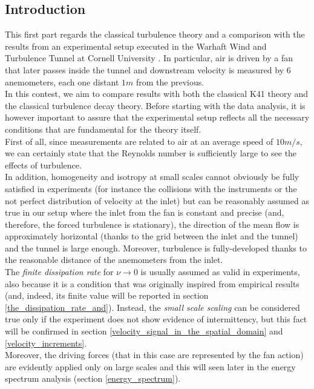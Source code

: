 \documentclass[11pt,titlepage]{article}
\begin{document}
\subsection{Introduction} %
This first part regards the classical turbulence theory and a comparison with the results from an experimental setup executed in the Warhaft Wind and Turbulence Tunnel at Cornell University \cite{yoon_warhaft_1990}. In particular, air is driven by a fan that later passes inside the tunnel and downstream velocity is measured by 6 anemometers, each one distant $1m$ from the previous. \\
In this contest, we aim to compare results with both the classical K41 theory and the classical turbulence decay theory. Before starting with the data analysis, it is however important to assure that the experimental setup reflects all the necessary conditions that are fundamental for the theory itself. \\
First of all, since measurements are related to air at an average speed of $10m/s$, we can certainly state that the Reynolds number is sufficiently large to see the effects of turbulence. \\
In addition, homogeneity and isotropy at small scales cannot obviously be fully satisfied in experiments (for instance the collisions with the instruments or the not perfect distribution of velocity at the inlet) but can be reasonably assumed as true in our setup where the inlet from the fan is constant and precise (and, therefore, the forced turbulence is stationary), the direction of the mean flow is approximately horizontal (thanks to the grid between the inlet and the tunnel) and the tunnel is large enough. Moreover, turbulence is fully-developed thanks to the reasonable distance of the anemometers from the inlet.\\
The \emph{finite dissipation rate} for $\nu \rightarrow 0$ is usually assumed as valid in experiments, also because it is a condition that was originally inspired from empirical results (and, indeed, its finite value will be reported in section \ref{the_dissipation_rate_and}). Instead, the \emph{small scale scaling} can be considered true only if the experiment does not show evidence of intermittency, but this fact will be confirmed in section \ref{velocity_signal_in_the_spatial_domain} and \ref{velocity_increments}. \\ 
Moreover, the driving forces (that in this case are represented by the fan action) are evidently applied only on large scales and this will seen later in the energy spectrum analysis (section \ref{energy_spectrum}). \\
\end{document}
